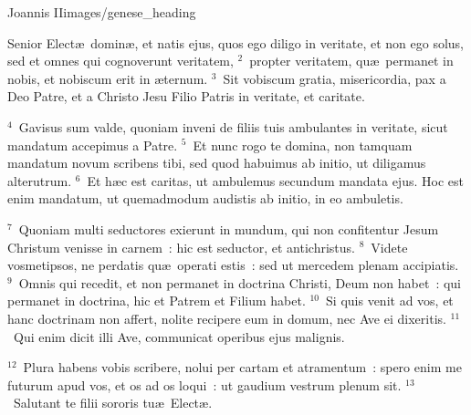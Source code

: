 {Joannis II}{images/genese_heading}

\noindent Senior Elect\ae\ domin\ae , et natis ejus, quos ego diligo in veritate, et non ego solus, sed et omnes qui cognoverunt veritatem,
${}^{2}$~propter veritatem, qu\ae\ permanet in nobis, et nobiscum erit in \ae ternum.
${}^{3}$~Sit vobiscum gratia, misericordia, pax a Deo Patre, et a Christo Jesu Filio Patris in veritate, et caritate.


${}^{4}$~Gavisus sum valde, quoniam inveni de filiis tuis ambulantes in veritate, sicut mandatum accepimus a Patre.
${}^{5}$~Et nunc rogo te domina, non tamquam mandatum novum scribens tibi, sed quod habuimus ab initio, ut diligamus alterutrum.
${}^{6}$~Et h\ae c est caritas, ut ambulemus secundum mandata ejus. Hoc est enim mandatum, ut quemadmodum audistis ab initio, in eo ambuletis.


${}^{7}$~Quoniam multi seductores exierunt in mundum, qui non confitentur Jesum Christum venisse in carnem~: hic est seductor, et antichristus.
${}^{8}$~Videte vosmetipsos, ne perdatis qu\ae\ operati estis~: sed ut mercedem plenam accipiatis.
${}^{9}$~Omnis qui recedit, et non permanet in doctrina Christi, Deum non habet~: qui permanet in doctrina, hic et Patrem et Filium habet.
${}^{10}$~Si quis venit ad vos, et hanc doctrinam non affert, nolite recipere eum in domum, nec Ave ei dixeritis.
${}^{11}$~Qui enim dicit illi Ave, communicat operibus ejus malignis.


${}^{12}$~Plura habens vobis scribere, nolui per cartam et atramentum~: spero enim me futurum apud vos, et os ad os loqui~: ut gaudium vestrum plenum sit.
${}^{13}$~Salutant te filii sororis tu\ae\ Elect\ae .

